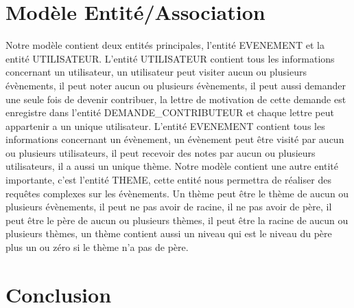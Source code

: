 \documentclass[french]{article}
\begin{document}
    \section{Modèle Entité/Association}
       Notre modèle contient deux entités principales, l'entité EVENEMENT et la entité UTILISATEUR. L'entité UTILISATEUR contient tous les informations concernant un utilisateur, un utilisateur peut visiter aucun ou plusieurs évènements, il peut noter aucun ou plusieurs évènements, il peut aussi demander une seule fois de devenir contribuer, la lettre de motivation de cette demande est enregistre dans l'entité DEMANDE\_CONTRIBUTEUR et chaque lettre peut appartenir a un unique utilisateur. L'entité EVENEMENT contient tous les informations concernant un évènement, un évènement peut être visité par aucun ou plusieurs utilisateurs, il peut recevoir des notes par aucun ou plusieurs utilisateurs, il a aussi un unique thème. Notre modèle contient une autre entité importante, c'est l'entité THEME, cette entité nous permettra de réaliser des requêtes complexes sur les évènements. Un thème peut être le thème de aucun ou plusieurs évènements, il peut ne pas avoir de racine, il ne pas avoir de père, il peut être le père de aucun ou plusieurs thèmes, il peut être la racine de aucun ou plusieurs thèmes, un thème contient aussi un niveau qui est le niveau du père plus un ou zéro si le thème n'a pas de père.
    \section{Conclusion}
\end{document}
